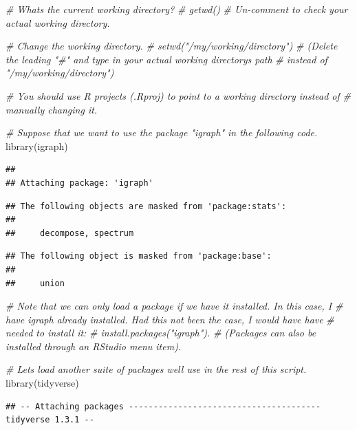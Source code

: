 \documentclass[
]{book}
\newenvironment{Shaded}{\begin{snugshade}}{\end{snugshade}}
\newcommand{\CommentTok}[1]{\textcolor[rgb]{0.56,0.35,0.01}{\textit{#1}}}
\newcommand{\FunctionTok}[1]{\textcolor[rgb]{0.00,0.00,0.00}{#1}}
\newcommand{\NormalTok}[1]{#1}
\begin{document}
\begin{Shaded}
\begin{Highlighting}[]
\CommentTok{\# What\textquotesingle{}s the current working directory? }
\CommentTok{\# getwd() }
\CommentTok{\# Un{-}comment to check your actual working directory.}

\CommentTok{\# Change the working directory. }
\CommentTok{\# setwd("/my/working/directory") }
\CommentTok{\# (Delete the leading "\#" and type in your actual working directory\textquotesingle{}s path}
\CommentTok{\# instead of "/my/working/directory")}

\CommentTok{\# You should use R projects (.Rproj) to point to a working directory instead of}
\CommentTok{\# manually changing it.}

\CommentTok{\# Suppose that we want to use the package "igraph" in the following code.}
\FunctionTok{library}\NormalTok{(igraph)}
\end{Highlighting}
\end{Shaded}

\begin{verbatim}
## 
## Attaching package: 'igraph'
\end{verbatim}

\begin{verbatim}
## The following objects are masked from 'package:stats':
## 
##     decompose, spectrum
\end{verbatim}

\begin{verbatim}
## The following object is masked from 'package:base':
## 
##     union
\end{verbatim}

\begin{Shaded}
\begin{Highlighting}[]
\CommentTok{\# Note that we can only load a package if we have it installed. In this case, I}
\CommentTok{\# have igraph already installed. Had this not been the case, I would have have}
\CommentTok{\# needed to install it: }
\CommentTok{\# install.packages("igraph").}
\CommentTok{\# (Packages can also be installed through an RStudio menu item).}

\CommentTok{\# Let\textquotesingle{}s load another suite of packages we\textquotesingle{}ll use in the rest of this script.}
\FunctionTok{library}\NormalTok{(tidyverse)}
\end{Highlighting}
\end{Shaded}

\begin{verbatim}
## -- Attaching packages --------------------------------------- tidyverse 1.3.1 --
\end{verbatim}
\end{document}
